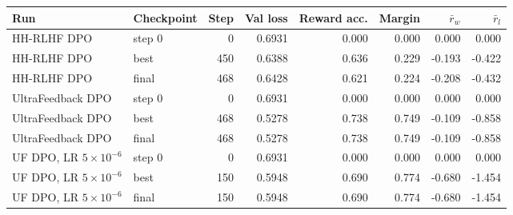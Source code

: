 \begin{tabular}{llrrrrrr}
\toprule
Run & Checkpoint & Step & Val loss & Reward acc. & Margin & $\bar r_w$ & $\bar r_l$ \\
\midrule
HH-RLHF DPO & step 0 & 0 & 0.6931 & 0.000 & 0.000 & 0.000 & 0.000 \\
HH-RLHF DPO & best & 450 & 0.6388 & 0.636 & 0.229 & -0.193 & -0.422 \\
HH-RLHF DPO & final & 468 & 0.6428 & 0.621 & 0.224 & -0.208 & -0.432 \\
UltraFeedback DPO & step 0 & 0 & 0.6931 & 0.000 & 0.000 & 0.000 & 0.000 \\
UltraFeedback DPO & best & 468 & 0.5278 & 0.738 & 0.749 & -0.109 & -0.858 \\
UltraFeedback DPO & final & 468 & 0.5278 & 0.738 & 0.749 & -0.109 & -0.858 \\
UF DPO, LR $5{\times}10^{-6}$ & step 0 & 0 & 0.6931 & 0.000 & 0.000 & 0.000 & 0.000 \\
UF DPO, LR $5{\times}10^{-6}$ & best & 150 & 0.5948 & 0.690 & 0.774 & -0.680 & -1.454 \\
UF DPO, LR $5{\times}10^{-6}$ & final & 150 & 0.5948 & 0.690 & 0.774 & -0.680 & -1.454 \\
\bottomrule
\end{tabular}
